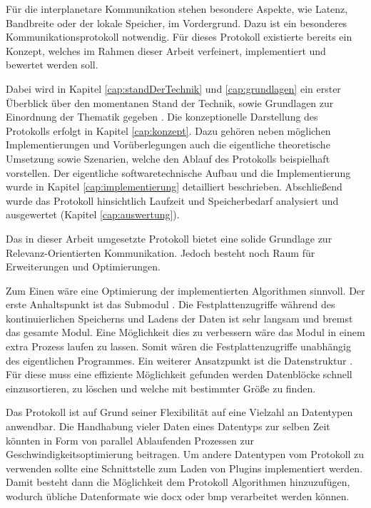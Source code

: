 Für die interplanetare Kommunikation stehen besondere Aspekte, wie Latenz,
Bandbreite oder der lokale Speicher, im Vordergrund. Dazu ist ein besonderes
Kommunikationsprotokoll notwendig. Für dieses Protokoll  existierte
bereits ein Konzept, welches im Rahmen dieser Arbeit verfeinert, implementiert
und bewertet werden soll.

Dabei wird in Kapitel \ref{cap:standDerTechnik} und \ref{cap:grundlagen} ein
erster Überblick über den momentanen Stand der Technik, sowie Grundlagen zur
Einordnung der Thematik gegeben 
.
Die konzeptionelle Darstellung des Protokolls erfolgt in Kapitel
\ref{cap:konzept}. Dazu gehören neben möglichen Implementierungen und
Vorüberlegungen auch die eigentliche theoretische Umsetzung sowie Szenarien,
welche den Ablauf des Protokolls beispielhaft vorstellen. Der eigentliche
softwaretechnische Aufbau und die Implementierung wurde in Kapitel
\ref{cap:implementierung} detailliert beschrieben. Abschließend wurde das
Protokoll hinsichtlich Laufzeit und Speicherbedarf analysiert und ausgewertet
(Kapitel \ref{cap:auswertung}). 

Das in dieser Arbeit umgesetzte Protokoll bietet eine solide
Grundlage zur Relevanz-Orientierten Kommunikation. Jedoch besteht noch Raum
für Erweiterungen und Optimierungen.

Zum Einen wäre eine Optimierung der implementierten Algorithmen sinnvoll.
Der erste Anhaltspunkt ist das Submodul .
Die Festplattenzugriffe während des kontinuierlichen Speicherns und Ladens der Daten
ist sehr langsam und bremst das gesamte Modul. Eine Möglichkeit dies zu
verbessern wäre das Modul in einem extra Prozess laufen zu lassen. Somit wären
die Festplattenzugriffe unabhängig des eigentlichen Programmes. Ein weiterer
Ansatzpunkt ist die Datenstruktur . Für diese muss
eine effiziente Möglichkeit gefunden werden Datenblöcke schnell
einzusortieren, zu löschen und welche mit bestimmter Größe zu finden.

Das Protokoll ist auf Grund seiner Flexibilität auf eine Vielzahl an Datentypen
anwendbar. Die Handhabung vieler Daten eines Datentyps zur selben Zeit könnten
in Form von parallel Ablaufenden Prozessen zur Geschwindigkeitsoptimierung
beitragen. Um andere Datentypen vom Protokoll zu verwenden sollte eine
Schnittstelle zum Laden von Plugins implementiert werden. Damit besteht dann die
Möglichkeit dem Protokoll Algorithmen hinzuzufügen, wodurch
übliche Datenformate wie docx oder bmp verarbeitet werden können.

